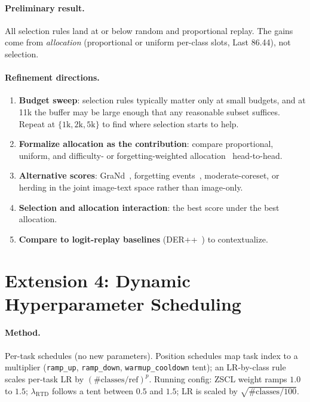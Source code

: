 \documentclass[11pt]{article}
\begin{document}
\paragraph{Preliminary result.} All selection rules land at or below random and proportional replay.
The gains come from \emph{allocation} (proportional or uniform per-class slots, Last 86.44), not
selection.

\paragraph{Refinement directions.}
\begin{enumerate}
  \item \textbf{Budget sweep}: selection rules typically matter only at small budgets, and at 11k the
        buffer may be large enough that any reasonable subset suffices. Repeat at $\{1\text{k},
        2\text{k}, 5\text{k}\}$ to find where selection starts to help.
  \item \textbf{Formalize allocation as the contribution}: compare proportional, uniform, and
        difficulty- or forgetting-weighted allocation~\cite{forgetting} head-to-head.
  \item \textbf{Alternative scores}: GraNd~\cite{el2n}, forgetting events~\cite{forgetting},
        moderate-coreset, or herding in the joint image-text space rather than image-only.
  \item \textbf{Selection and allocation interaction}: the best score under the best allocation.
  \item \textbf{Compare to logit-replay baselines} (DER++~\cite{derpp}) to contextualize.
\end{enumerate}

\section{Extension 4: Dynamic Hyperparameter Scheduling}

\paragraph{Method.} Per-task schedules (no new parameters). Position schedules map task index to a
multiplier (\texttt{ramp\_up}, \texttt{ramp\_down}, \texttt{warmup\_cooldown} tent); an LR-by-class
rule scales per-task LR by $(\#\text{classes}/\text{ref})^{p}$. Running config: ZSCL weight ramps
$1.0$ to $1.5$; $\lambda_{\text{RTD}}$ follows a tent between $0.5$ and $1.5$; LR is scaled by
$\sqrt{\#\text{classes}/100}$.
\end{document}
